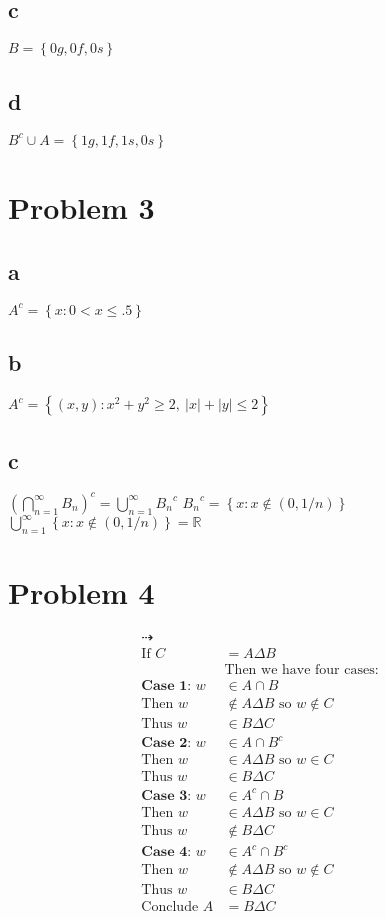 \documentclass{article}
\begin{document}
\begin{flushleft}
\subsection*{c}
$B=\left\{0g,0f,0s \right\}$
\subsection*{d}
$B^c\cup A=\left\{1g,1f,1s,0s \right\}$

\section*{Problem 3}
\subsection*{a}
$A^c=\left\{x:0<x\leq .5 \right\}$
\subsection*{b}
$A^c=\left\{(x,y):x^2+y^2 \geq 2 ,\ |x|+|y|\leq 2 \right\}$
\subsection*{c}
$\left(\bigcap \limits_{n=1}^{\infty}B_n\right)^c=\bigcup\limits_{n=1}^{\infty}{B_n}^c$\medbreak
${B_n}^c=\left\{x:x\notin (0,1/n) \right\}$\medbreak
$\bigcup\limits_{n=1}^{\infty}\left\{x:x\notin (0,1/n) \right\}=\mathbb{R}$

\pagebreak
{}
\section*{Problem 4}
\begin{align*}
\dashrightarrow\\
\text{If } C&=A\Delta B \\
&\text{Then we have four cases:}\\
\textbf{Case 1: } w&\in A \cap B\\
\text{Then } w&\notin A\Delta B \text{ so } w\notin C\\
\text{Thus } w&\in B\Delta C\\
\textbf{Case 2: } w&\in A \cap B^c\\
\text{Then } w&\in A\Delta B \text{ so } w\in C\\
\text{Thus } w&\in B\Delta C\\
\textbf{Case 3: } w&\in A^c \cap B\\
\text{Then } w&\in A\Delta B \text{ so } w\in C\\
\text{Thus } w&\notin B\Delta C\\
\textbf{Case 4: } w&\in A^c \cap B^c\\
\text{Then } w&\notin A\Delta B \text{ so } w\notin C\\
\text{Thus } w&\in B\Delta C\\
\text{Conclude } A&=B\Delta C
\end{align*}


\end{flushleft}
\end{document}
